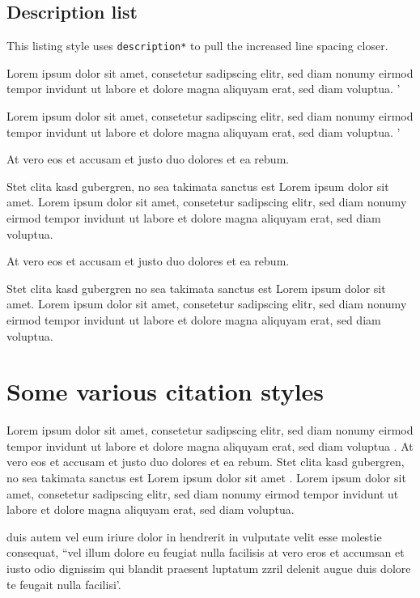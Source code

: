 \subsection{Description list}
This listing style uses \texttt{description*} to pull the increased line spacing closer.
\begin{description*}
\item[Lorem ipsum] dolor sit amet, consetetur sadipscing elitr, sed diam nonumy eirmod tempor invidunt ut labore et dolore magna aliquyam erat, sed diam voluptua. '
	\begin{enumerate*}
	\item Lorem ipsum dolor sit amet, consetetur sadipscing elitr, sed diam nonumy eirmod tempor invidunt ut labore et dolore magna aliquyam erat, sed diam voluptua. '
	\item At vero eos et accusam et justo duo dolores et ea rebum. 
	\item Stet clita kasd gubergren, no sea takimata sanctus est Lorem ipsum dolor sit amet. Lorem ipsum dolor sit amet, consetetur sadipscing elitr, sed diam nonumy eirmod tempor invidunt ut labore et dolore magna aliquyam erat, sed diam voluptua.
	\end{enumerate*}
\item[At vero eos et accusam] et justo duo dolores et ea rebum. 
\item[Stet clita kasd gubergren] no sea takimata sanctus est Lorem ipsum dolor sit amet. Lorem ipsum dolor sit amet, consetetur sadipscing elitr, sed diam nonumy eirmod tempor invidunt ut labore et dolore magna aliquyam erat, sed diam voluptua.
\end{description*}

\section{Some various citation styles}
\nobreak
Lorem ipsum dolor sit amet, consetetur sadipscing elitr, sed diam nonumy eirmod tempor invidunt ut labore et dolore magna aliquyam erat, sed diam voluptua \cite{Quine2004}. At vero eos et accusam et justo duo dolores et ea rebum. Stet clita kasd gubergren, no sea takimata sanctus est Lorem ipsum dolor sit amet \cite{Peirce1992a}. Lorem ipsum dolor sit amet, consetetur sadipscing elitr, sed diam nonumy eirmod tempor invidunt ut labore et dolore magna aliquyam erat, sed diam voluptua.

 duis autem vel eum iriure dolor in hendrerit in vulputate velit esse molestie consequat, ``vel illum dolore eu feugiat nulla facilisis at vero eros et accumsan et iusto odio dignissim qui blandit praesent luptatum zzril delenit augue duis dolore te feugait nulla facilisi'.

